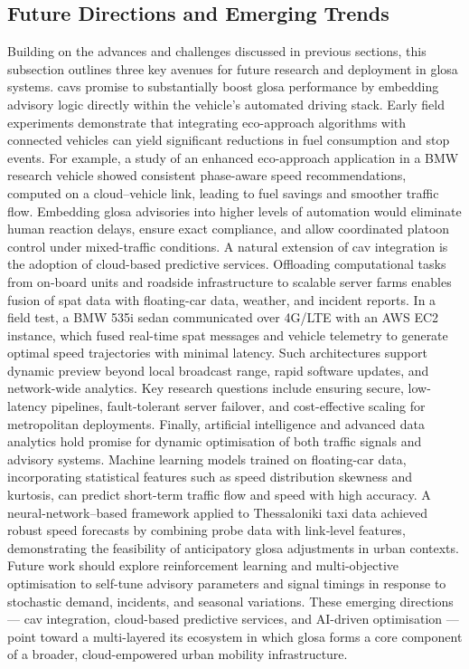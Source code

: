 \subsection{Future Directions and Emerging Trends}
\label{subsec:future_trends}

Building on the advances and challenges discussed in previous sections, this subsection outlines three key avenues for future research and deployment in \ac{glosa} systems.
\mynewline
\acp{cav} promise to substantially boost \ac{glosa} performance by embedding advisory logic directly within the vehicle’s automated driving stack. Early field experiments demonstrate that integrating eco-approach algorithms with connected vehicles can yield significant reductions in fuel consumption and stop events. For example, a study of an enhanced eco-approach application in a BMW research vehicle showed consistent phase-aware speed recommendations, computed on a cloud–vehicle link, leading to fuel savings and smoother traffic flow. \cite{Xia2013} Embedding \ac{glosa} advisories into higher levels of automation would eliminate human reaction delays, ensure exact compliance, and allow coordinated platoon control under mixed-traffic conditions.
\mynewline
A natural extension of \ac{cav} integration is the adoption of cloud-based predictive services. Offloading computational tasks from on-board units and roadside infrastructure to scalable server farms enables fusion of \ac{spat} data with floating-car data, weather, and incident reports. In a field test, a BMW 535i sedan communicated over 4G/LTE with an AWS EC2 instance, which fused real-time \ac{spat} messages and vehicle telemetry to generate optimal speed trajectories with minimal latency. \cite{Cloud2016} Such architectures support dynamic preview beyond local broadcast range, rapid software updates, and network-wide analytics. Key research questions include ensuring secure, low-latency pipelines, fault-tolerant server failover, and cost-effective scaling for metropolitan deployments.
\mynewline
Finally, artificial intelligence and advanced data analytics hold promise for dynamic optimisation of both traffic signals and advisory systems. Machine learning models trained on floating-car data, incorporating statistical features such as speed distribution skewness and kurtosis, can predict short-term traffic flow and speed with high accuracy. A neural-network–based framework applied to Thessaloniki taxi data achieved robust speed forecasts by combining probe data with link‐level features, demonstrating the feasibility of anticipatory \ac{glosa} adjustments in urban contexts. \cite{Aifadopoulou2019} Future work should explore reinforcement learning and multi-objective optimisation to self-tune advisory parameters and signal timings in response to stochastic demand, incidents, and seasonal variations.
\mynewline
These emerging directions --- \ac{cav} integration, cloud-based predictive services, and AI-driven optimisation --- point toward a multi-layered \ac{its} ecosystem in which \ac{glosa} forms a core component of a broader, cloud-empowered urban mobility infrastructure.
